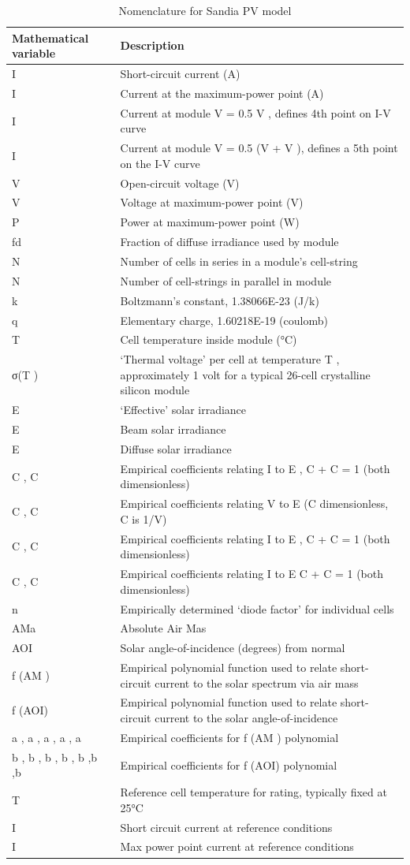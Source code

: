 \begin{longtable}[c]{p{1.5in}p{4.5in}}
\caption{Nomenclature for Sandia PV model \protect \label{table:nomenclature-for-sandia-pv-model}}\\
\toprule 
Mathematical variable & Description \tabularnewline \midrule
\endhead
I & Short-circuit current (A) \tabularnewline
I & Current at the maximum-power point (A) \tabularnewline
I & Current at module V = 0.5 V  , defines 4th point on I-V curve \tabularnewline
I & Current at module V = 0.5 (V   + V  ), defines a 5th point on the I-V curve \tabularnewline
V & Open-circuit voltage (V) \tabularnewline
V & Voltage at maximum-power point (V) \tabularnewline
P & Power at maximum-power point (W) \tabularnewline
fd & Fraction of diffuse irradiance used by module \tabularnewline
N & Number of cells in series in a module’s cell-string \tabularnewline
N & Number of cell-strings in parallel in module \tabularnewline
k & Boltzmann’s constant, 1.38066E-23 (J/k) \tabularnewline
q & Elementary charge, 1.60218E-19 (coulomb) \tabularnewline
T & Cell temperature inside module (°C) \tabularnewline
σ(T  ) & ‘Thermal voltage’ per cell at temperature T  , approximately 1 volt for a typical 26-cell crystalline silicon module \tabularnewline
E & ‘Effective’ solar irradiance \tabularnewline
E & Beam solar irradiance \tabularnewline
E & Diffuse solar irradiance \tabularnewline
C   , C & Empirical coefficients relating I   to E   , C   + C   = 1 (both dimensionless) \tabularnewline
C   , C & Empirical coefficients relating V   to E  (C   dimensionless, C   is 1/V) \tabularnewline
C   , C & Empirical coefficients relating I   to E  , C   + C   = 1 (both dimensionless) \tabularnewline
C   , C & Empirical coefficients relating I   to E   C   + C   = 1 (both dimensionless) \tabularnewline
n & Empirically determined ‘diode factor’ for individual cells \tabularnewline
AMa & Absolute Air Mas \tabularnewline
AOI & Solar angle-of-incidence (degrees) from normal \tabularnewline
f  (AM  ) & Empirical polynomial function used to relate short-circuit current to the solar spectrum via air mass \tabularnewline
f  (AOI) & Empirical polynomial function used to relate short-circuit current to the solar angle-of-incidence \tabularnewline
a  , a  , a  , a  , a & Empirical coefficients for f  (AM  ) polynomial \tabularnewline
b  , b  , b  , b  , b  ,b  ,b & Empirical coefficients for f  (AOI) polynomial \tabularnewline
T & Reference cell temperature for rating, typically fixed at 25°C \tabularnewline
I & Short circuit current at reference conditions \tabularnewline
I & Max power point current at reference conditions \tabularnewline

\end{longtable}
